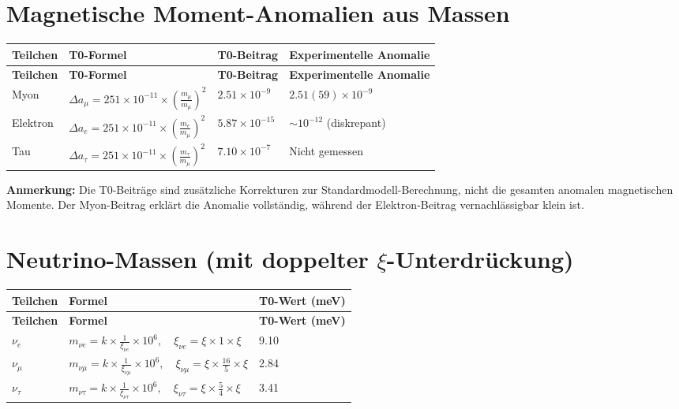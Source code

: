 \documentclass[12pt,a4paper]{article}
\begin{document}
	\section{Magnetische Moment-Anomalien aus Massen}
	\begin{longtable}{|p{3cm}|p{5cm}|p{4cm}|p{3cm}|}
		\hline
		\textbf{Teilchen} & \textbf{T0-Formel} & \textbf{T0-Beitrag} & \textbf{Experimentelle Anomalie} \\
		\hline
		\endfirsthead
		\hline
		\textbf{Teilchen} & \textbf{T0-Formel} & \textbf{T0-Beitrag} & \textbf{Experimentelle Anomalie} \\
		\hline
		\endhead
		Myon & $\Delta a_{\mu} = 251 \times 10^{-11} \times \left(\frac{m_{\mu}}{m_{\mu}}\right)^{2}$ & $2.51 \times 10^{-9}$ & $2.51(59) \times 10^{-9}$ \\
		\hline
		Elektron & $\Delta a_{e} = 251 \times 10^{-11} \times \left(\frac{m_{e}}{m_{\mu}}\right)^{2}$ & $5.87 \times 10^{-15}$ & $\sim 10^{-12}$ (diskrepant) \\
		\hline
		Tau & $\Delta a_{\tau} = 251 \times 10^{-11} \times \left(\frac{m_{\tau}}{m_{\mu}}\right)^{2}$ & $7.10 \times 10^{-7}$ & Nicht gemessen \\
		\hline
	\end{longtable}
	
	\textbf{Anmerkung:} Die T0-Beiträge sind zusätzliche Korrekturen zur Standardmodell-Berechnung, nicht die gesamten anomalen magnetischen Momente. Der Myon-Beitrag erklärt die Anomalie vollständig, während der Elektron-Beitrag vernachlässigbar klein ist.
	
	\section{Neutrino-Massen (mit doppelter $\xi$-Unterdrückung)}
	\begin{longtable}{|p{3cm}|p{5cm}|p{3cm}|}
		\hline
		\textbf{Teilchen} & \textbf{Formel} & \textbf{T0-Wert (meV)} \\
		\hline
		\endfirsthead
		\hline
		\textbf{Teilchen} & \textbf{Formel} & \textbf{T0-Wert (meV)} \\
		\hline
		\endhead
		$\nu_e$ & $m_{\nu e} = k \times \frac{1}{\xi_{\nu e}} \times 10^6, \quad \xi_{\nu e} = \xi \times 1 \times \xi$ & 9.10 \\
		\hline
		$\nu_{\mu}$ & $m_{\nu \mu} = k \times \frac{1}{\xi_{\nu \mu}} \times 10^6, \quad \xi_{\nu \mu} = \xi \times \frac{16}{5} \times \xi$ & 2.84 \\
		\hline
		$\nu_{\tau}$ & $m_{\nu \tau} = k \times \frac{1}{\xi_{\nu \tau}} \times 10^6, \quad \xi_{\nu \tau} = \xi \times \frac{5}{4} \times \xi$ & 3.41 \\
		\hline
	\end{longtable}
	
\end{document}
